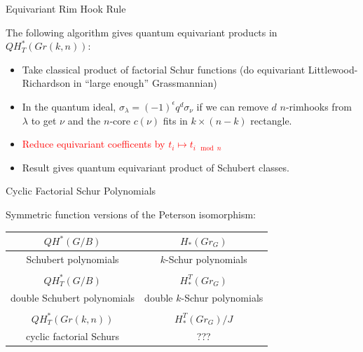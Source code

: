 \documentclass{beamer}
\begin{document}
\begin{frame}{Equivariant Rim Hook Rule}


\begin{theorem} The following algorithm gives quantum equivariant products in $QH^*_T(Gr(k,n))$: %
\begin{itemize} 
\item Take classical product of factorial Schur functions (do equivariant Littlewood-Richardson in ``large enough'' Grassmannian) %
\item In the quantum ideal, $\sigma_{\lambda} = (-1)^{\epsilon} q^d \sigma_{\nu}$ if we can remove $d$ $n$-rimhooks from $\lambda$ to get $\nu$ and the $n$-core $c(\nu)$ fits in $k \times (n-k)$ rectangle. %
\item \textcolor{red}{Reduce equivariant coefficents by $t_i \mapsto t_{i \mod n}$} %
\item Result gives quantum equivariant product of Schubert classes.
\end{itemize}\end{theorem}


\end{frame}



\begin{frame}{Cyclic Factorial Schur Polynomials}

Symmetric function versions of the Peterson isomorphism:
\medskip
\medskip

\begin{tabular}{|c|c|}
\hline
$QH^*(G/B)$ & $H_*(Gr_G)$ \\ 
\hline
Schubert polynomials & $k$-Schur polynomials \\
\hline
\multicolumn{2}{|c|}{} \\
\hline
$QH_T^*(G/B)$ & $H^T_*(Gr_G)$ \\ 
\hline 
double Schubert polynomials & double $k$-Schur polynomials\\
\hline
\multicolumn{2}{|c|}{} \\
\hline
$QH_T^*(Gr(k,n))$ & $H^T_*(Gr_G)/J$ \\ 
\hline 
cyclic factorial Schurs & ???\\
\hline
\end{tabular}


\end{frame} 


\end{document}
